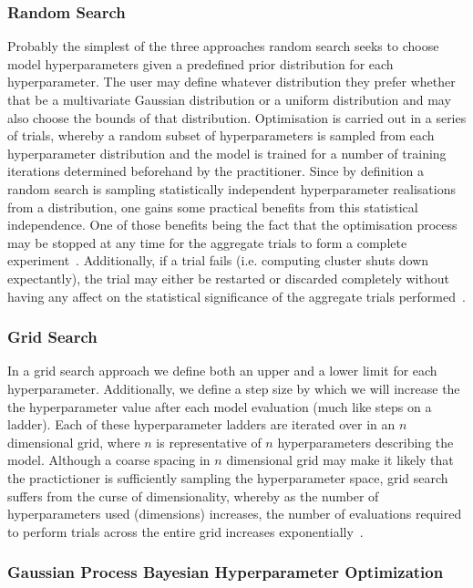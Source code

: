 \subsubsection{Random Search}
Probably the simplest of the three approaches random search 
seeks to choose model hyperparameters given a 
predefined prior distribution for each hyperparameter. 
The user may define whatever distribution they prefer 
whether that be a multivariate Gaussian distribution 
or a uniform distribution and may also choose the 
bounds of that distribution. Optimisation is carried out 
in a series of trials, whereby a random subset of hyperparameters 
is sampled from each hyperparameter distribution and the model 
is trained for a number of training iterations determined beforehand 
by the practitioner. Since by definition 
a random search is sampling statistically 
independent hyperparameter realisations from a 
distribution, one gains some practical benefits 
from this statistical independence. One of those benefits being the 
fact that the optimisation process may be stopped at any time 
for the aggregate trials to form a complete experiment~\cite{JMLR:v13:bergstra12a}. 
Additionally, if a trial fails (i.e. computing cluster shuts down 
expectantly), the trial may either be restarted or discarded completely 
without having any affect on the statistical significance of the 
aggregate trials performed~\cite{JMLR:v13:bergstra12a}.


\subsubsection{Grid Search}

In a grid search approach we define both an upper and a lower limit 
for each hyperparameter. Additionally, we define a step 
size by which we will increase the the hyperparameter 
value after each model evaluation (much like steps 
on a ladder). Each of these hyperparameter 
ladders are iterated over in an $n$ dimensional grid, 
where $n$ is representative of $n$ hyperparameters 
describing the model. Although a coarse spacing 
in $n$ dimensional grid may make it likely that the 
practictioner is sufficiently sampling the hyperparameter 
space, grid search suffers from the curse of dimensionality, 
whereby as the number of hyperparameters used (dimensions) 
increases, the number of evaluations required to perform 
trials across the entire grid increases exponentially~\cite{JMLR:v13:bergstra12a}.

\subsubsection{Gaussian Process Bayesian Hyperparameter Optimization}


